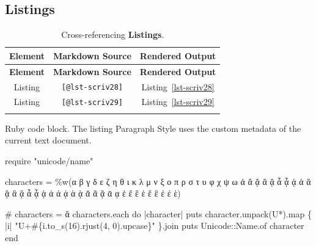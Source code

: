 \documentclass[
  12pt,
  a4paper,
  oneside,
  titlepage,
  toclink=all,
  toc=bibliography]{scrbook}
\newenvironment{Shaded}{\begin{snugshade}}{\end{snugshade}}
\newcommand{\AttributeTok}[1]{\textcolor[rgb]{0.40,0.45,0.13}{#1}}
\newcommand{\CharTok}[1]{\textcolor[rgb]{0.13,0.47,0.30}{#1}}
\newcommand{\CommentTok}[1]{\textcolor[rgb]{0.37,0.37,0.37}{#1}}
\newcommand{\ControlFlowTok}[1]{\textcolor[rgb]{0.00,0.23,0.31}{#1}}
\newcommand{\DataTypeTok}[1]{\textcolor[rgb]{0.68,0.00,0.00}{#1}}
\newcommand{\DecValTok}[1]{\textcolor[rgb]{0.68,0.00,0.00}{#1}}
\newcommand{\FunctionTok}[1]{\textcolor[rgb]{0.28,0.35,0.67}{#1}}
\newcommand{\KeywordTok}[1]{\textcolor[rgb]{0.00,0.23,0.31}{#1}}
\newcommand{\NormalTok}[1]{\textcolor[rgb]{0.00,0.23,0.31}{#1}}
\newcommand{\OtherTok}[1]{\textcolor[rgb]{0.00,0.23,0.31}{#1}}
\newcommand{\SpecialCharTok}[1]{\textcolor[rgb]{0.37,0.37,0.37}{#1}}
\newcommand{\StringTok}[1]{\textcolor[rgb]{0.13,0.47,0.30}{#1}}
\newcommand{\VerbatimStringTok}[1]{\textcolor[rgb]{0.13,0.47,0.30}{#1}}
\theoremstyle{definition}
\theoremstyle{plain}
\theoremstyle{plain}
\theoremstyle{plain}
\theoremstyle{plain}
\theoremstyle{definition}
\theoremstyle{definition}
\theoremstyle{plain}
\theoremstyle{remark}
\begin{document}
\hypertarget{sec-scriv27}{%
\subsection{Listings}\label{sec-scriv27}}

\protect\hypertarget{scriv27}{}{}

\hypertarget{tbl-scriv27}{}
\begin{longtable}[]{@{}ccc@{}}
\toprule\noalign{}
\textbf{Element} & \textbf{Markdown Source} & \textbf{Rendered
Output} \\
\midrule\noalign{}
\endfirsthead
\toprule\noalign{}
\textbf{Element} & \textbf{Markdown Source} & \textbf{Rendered
Output} \\
\midrule\noalign{}
\endhead
\bottomrule\noalign{}
\endlastfoot
Listing & \texttt{{[}@lst-scriv28{]}} &
\protect\hypertarget{cite_65}{}{\label{cite_65}Listing~\ref{lst-scriv28}} \\
Listing & \texttt{{[}@lst-scriv29{]}} &
\protect\hypertarget{cite_66}{}{\label{cite_66}Listing~\ref{lst-scriv29}} \\
\caption{\label{tbl-scriv27}Cross-referencing
\textbf{Listings}.}\tabularnewline
\end{longtable}

\begin{codelisting}

\caption{Ruby code block. The listing Paragraph Style uses the custom
metadata of the current text document.}

\hypertarget{lst-scriv28}{%
\label{lst-scriv28}}%
\begin{Shaded}
\begin{Highlighting}[numbers=left,,]
\FunctionTok{require} \StringTok{"unicode/name"}

\NormalTok{characters }\KeywordTok{=}\OtherTok{ \%w(}\StringTok{α β γ δ ε ζ η θ ι κ λ μ ν ξ ο π ρ σ τ υ φ χ ψ ω ἀ ἄ ᾄ ἂ ᾂ ἆ ᾆ ᾀ ἁ ἅ ᾅ ἃ ᾃ ἇ ᾇ ᾁ ά ά ᾴ ὰ ᾲ ᾰ ᾶ ᾷ ᾱ ᾳ ἐ ἔ ἒ ἑ ἕ ἓ έ έ ὲ}\OtherTok{)}

\CommentTok{\# characters = \textquotesingle{}ἄ\textquotesingle{}}
\NormalTok{characters}\AttributeTok{.each} \ControlFlowTok{do} \KeywordTok{|}\NormalTok{character}\KeywordTok{|}
  \FunctionTok{puts}\NormalTok{ character}\AttributeTok{.unpack}\NormalTok{(}\VerbatimStringTok{\textquotesingle{}U*\textquotesingle{}}\NormalTok{)}\AttributeTok{.map} \KeywordTok{\{} \KeywordTok{|}\NormalTok{i}\KeywordTok{|} \StringTok{"U+}\SpecialCharTok{\#\{}\NormalTok{i}\AttributeTok{.to\_s}\NormalTok{(}\DecValTok{16}\NormalTok{)}\AttributeTok{.rjust}\NormalTok{(}\DecValTok{4}\NormalTok{, }\CharTok{\textquotesingle{}0\textquotesingle{}}\NormalTok{)}\AttributeTok{.upcase}\SpecialCharTok{\}}\StringTok{"} \KeywordTok{\}}\AttributeTok{.join}
  \FunctionTok{puts} \DataTypeTok{Unicode}\KeywordTok{::}\DataTypeTok{Name}\AttributeTok{.of}\NormalTok{ character}
\ControlFlowTok{end}
\end{Highlighting}
\end{Shaded}

\end{codelisting}
\end{document}
